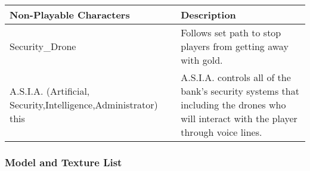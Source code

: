 \documentclass[11pt]{report}
\begin{document}
\begin{center}
    \begin{tabular}{| p{.45\linewidth} | p{.45\linewidth} |}
        \hline    
        Non-Playable Characters &   Description  \\ \hline
        Security\_Drone &    Follows set path to stop players from getting away with gold.  \\ \hline
        A.S.I.A. (Artificial, Security,Intelligence,Administrator) this &   A.S.I.A. controls all of the bank’s security systems that including the drones who will interact with the player through voice lines.  \\
        \hline
    \end{tabular}
\end{center}

\subsubsection{Model and Texture List}
\end{document}

